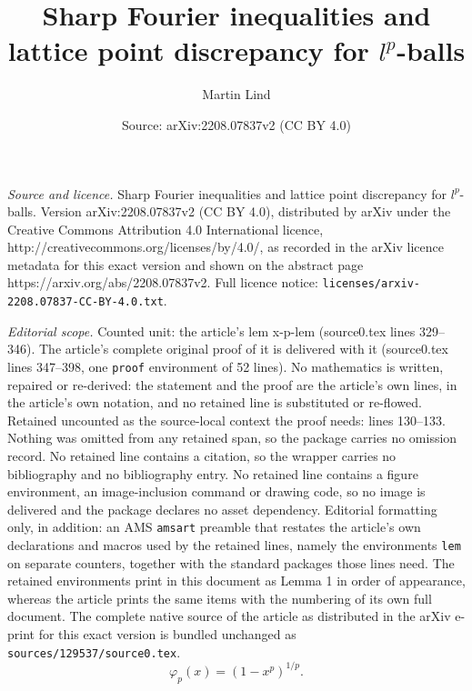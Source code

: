 \documentclass[10pt,a4paper]{amsart}
\title{Sharp Fourier inequalities and lattice point discrepancy for $l^p$-balls}
\author{Martin Lind}
\date{Source: arXiv:2208.07837v2 (CC BY 4.0)}
\begin{document}
\maketitle

\noindent\emph{Source and licence.} Sharp Fourier inequalities and lattice point discrepancy for $l^p$-balls. Version arXiv:2208.07837v2 (CC BY 4.0), distributed by arXiv under the Creative Commons Attribution 4.0 International licence, http://creativecommons.org/licenses/by/4.0/, as recorded in the arXiv licence metadata for this exact version and shown on the abstract page https://arxiv.org/abs/2208.07837v2. Full licence notice: \texttt{licenses/arxiv-2208.07837-CC-BY-4.0.txt}.\par\smallskip

\noindent\textit{Editorial scope.} Counted unit: the article's lem x-p-lem (source0.tex lines 329--346). The article's complete original proof of it is delivered with it (source0.tex lines 347--398, one \texttt{proof} environment of 52 lines). No mathematics is written, repaired or re-derived: the statement and the proof are the article's own lines, in the article's own notation, and no retained line is substituted or re-flowed.  Retained uncounted as the source-local context the proof needs: lines 130--133.  Nothing was omitted from any retained span, so the package carries no omission record.  No retained line contains a citation, so the wrapper carries no bibliography and no bibliography entry.  No retained line contains a figure environment, an image-inclusion command or drawing code, so no image is delivered and the package declares no asset dependency.  Editorial formatting only, in addition: an AMS \texttt{amsart} preamble that restates the article's own declarations and macros used by the retained lines, namely the environments \texttt{lem} on separate counters, together with the standard packages those lines need.  The retained environments print in this document as Lemma 1 in order of appearance, whereas the article prints the same items with the numbering of its own full document.  The complete native source of the article as distributed in the arXiv e-print for this exact version is bundled unchanged as \texttt{sources/129537/source0.tex}.
\begin{equation}
\label{phi-Function}
\varphi_p(x)=\left(1-x^p\right)^{1/p}.
\end{equation}
\end{document}
